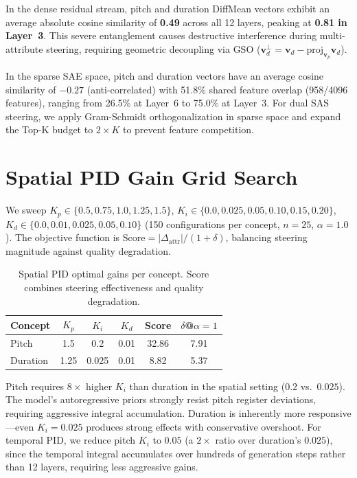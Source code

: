 \documentclass{article}
\theoremstyle{plain}
\begin{document}
In the dense residual stream, pitch and duration DiffMean vectors exhibit an average absolute cosine similarity of \textbf{0.49} across all 12 layers, peaking at \textbf{0.81 in Layer~3}. This severe entanglement causes destructive interference during multi-attribute steering, requiring geometric decoupling via GSO ($\mathbf{v}^{\perp}_d = \mathbf{v}_d - \text{proj}_{\mathbf{v}_p}\mathbf{v}_d$).

In the sparse SAE space, pitch and duration vectors have an average cosine similarity of $-0.27$ (anti-correlated) with 51.8\% shared feature overlap (958/4096 features), ranging from 26.5\% at Layer~6 to 75.0\% at Layer~3. For dual SAS steering, we apply Gram-Schmidt orthogonalization in sparse space and expand the Top-K budget to $2{\times}K$ to prevent feature competition.

\section{Spatial PID Gain Grid Search}
\label{app:grid_search}

We sweep $K_p \in \{0.5, 0.75, 1.0, 1.25, 1.5\}$, $K_i \in \{0.0, 0.025, 0.05, 0.10, 0.15, 0.20\}$, $K_d \in \{0.0, 0.01, 0.025, 0.05, 0.10\}$ (150 configurations per concept, $n{=}25$, $\alpha{=}1.0$). The objective function is $\text{Score} = |\Delta_\text{attr}| / (1 + \delta)$, balancing steering magnitude against quality degradation.

\begin{table}[h]
  \caption{Spatial PID optimal gains per concept. Score combines steering effectiveness and quality degradation.}
  \label{tab:grid_search}
  \begin{center}
  \begin{small}
  \begin{tabular}{lccccc}
    \toprule
    Concept & $K_p$ & $K_i$ & $K_d$ & Score & $\delta$@$\alpha{=}1$ \\
    \midrule
    Pitch & 1.5 & 0.2 & 0.01 & 32.86 & 7.91 \\
    Duration & 1.25 & 0.025 & 0.01 & 8.82 & 5.37 \\
    \bottomrule
  \end{tabular}
  \end{small}
  \end{center}
\end{table}

Pitch requires $8{\times}$ higher $K_i$ than duration in the spatial setting ($0.2$ vs.\ $0.025$). The model's autoregressive priors strongly resist pitch register deviations, requiring aggressive integral accumulation. Duration is inherently more responsive---even $K_i{=}0.025$ produces strong effects with conservative overshoot. For temporal PID, we reduce pitch $K_i$ to $0.05$ (a $2{\times}$ ratio over duration's $0.025$), since the temporal integral accumulates over hundreds of generation steps rather than 12 layers, requiring less aggressive gains.
\end{document}
